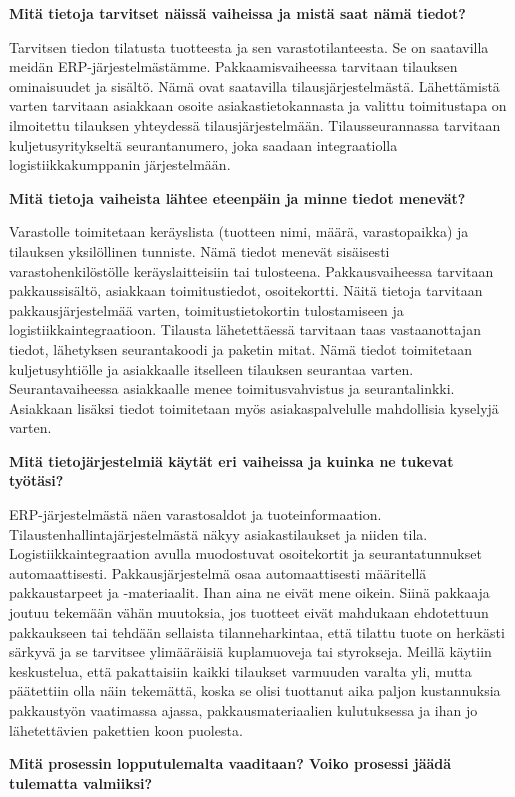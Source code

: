 \documentclass[
  finnish,
  letterpaper,
  DIV=11,
  numbers=noendperiod,
  oneside]{scrreprt}
\begin{document}
\textbf{Mitä tietoja tarvitset näissä vaiheissa ja mistä saat nämä
tiedot?}

Tarvitsen tiedon tilatusta tuotteesta ja sen varastotilanteesta. Se on
saatavilla meidän ERP-järjestelmästämme. Pakkaamisvaiheessa tarvitaan
tilauksen ominaisuudet ja sisältö. Nämä ovat saatavilla
tilausjärjestelmästä. Lähettämistä varten tarvitaan asiakkaan osoite
asiakastietokannasta ja valittu toimitustapa on ilmoitettu tilauksen
yhteydessä tilausjärjestelmään. Tilausseurannassa tarvitaan
kuljetusyritykseltä seurantanumero, joka saadaan integraatiolla
logistiikkakumppanin järjestelmään.

\textbf{Mitä tietoja vaiheista lähtee eteenpäin ja minne tiedot
menevät?}

Varastolle toimitetaan keräyslista (tuotteen nimi, määrä, varastopaikka)
ja tilauksen yksilöllinen tunniste. Nämä tiedot menevät sisäisesti
varastohenkilöstölle keräyslaitteisiin tai tulosteena. Pakkausvaiheessa
tarvitaan pakkaussisältö, asiakkaan toimitustiedot, osoitekortti. Näitä
tietoja tarvitaan pakkausjärjestelmää varten, toimitustietokortin
tulostamiseen ja logistiikkaintegraatioon. Tilausta lähetettäessä
tarvitaan taas vastaanottajan tiedot, lähetyksen seurantakoodi ja
paketin mitat. Nämä tiedot toimitetaan kuljetusyhtiölle ja asiakkaalle
itselleen tilauksen seurantaa varten. Seurantavaiheessa asiakkaalle
menee toimitusvahvistus ja seurantalinkki. Asiakkaan lisäksi tiedot
toimitetaan myös asiakaspalvelulle mahdollisia kyselyjä varten.

\textbf{Mitä tietojärjestelmiä käytät eri vaiheissa ja kuinka ne tukevat
työtäsi?}

ERP-järjestelmästä näen varastosaldot ja tuoteinformaation.
Tilaustenhallintajärjestelmästä näkyy asiakastilaukset ja niiden tila.
Logistiikkaintegraation avulla muodostuvat osoitekortit ja
seurantatunnukset automaattisesti. Pakkausjärjestelmä osaa
automaattisesti määritellä pakkaustarpeet ja -materiaalit. Ihan aina ne
eivät mene oikein. Siinä pakkaaja joutuu tekemään vähän muutoksia, jos
tuotteet eivät mahdukaan ehdotettuun pakkaukseen tai tehdään sellaista
tilanneharkintaa, että tilattu tuote on herkästi särkyvä ja se tarvitsee
ylimääräisiä kuplamuoveja tai styrokseja. Meillä käytiin keskustelua,
että pakattaisiin kaikki tilaukset varmuuden varalta yli, mutta
päätettiin olla näin tekemättä, koska se olisi tuottanut aika paljon
kustannuksia pakkaustyön vaatimassa ajassa, pakkausmateriaalien
kulutuksessa ja ihan jo lähetettävien pakettien koon puolesta.

\textbf{Mitä prosessin lopputulemalta vaaditaan? Voiko prosessi jäädä
tulematta valmiiksi?}
\end{document}
